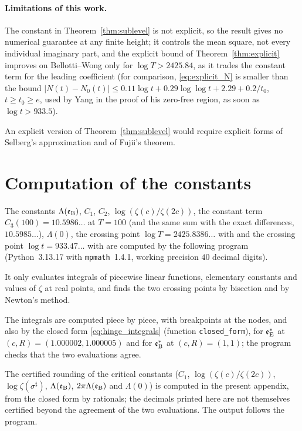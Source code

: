 \documentclass[11pt,a4paper]{article}
\makeatletter
\numberwithin{equation}{section}
\DeclareRobustCommand{\CGref}[1]{\ref{#1}}
\DeclareRobustCommand{\CGeqref}[1]{\eqref{#1}}
\DeclareRobustCommand{\CGcite}[2][]{\if\relax\detokenize{#1}\relax\cite{#2}\else\cite[#1]{#2}\fi}
\let\CG@origref\ref
\let\CG@origeqref\eqref
\newcommand{\CG@gettip}[1]{\@ifundefined{CGTip@#1}{#1}{\csname CGTip@#1\endcsname}}
\newcommand{\CG@getbib}[1]{\@ifundefined{CGBib@#1}{#1}{\csname CGBib@#1\endcsname}}
\DeclareRobustCommand{\CGref}[1]{\pdftooltip{\CG@origref{#1}}{\CG@gettip{#1}}}
\DeclareRobustCommand{\CGeqref}[1]{\pdftooltip{\CG@origeqref{#1}}{\CG@gettip{#1}}}
\DeclareRobustCommand{\CGcite}[2][]{\pdftooltip{\if\relax\detokenize{#1}\relax\cite{#2}\else\cite[#1]{#2}\fi}{\CG@getbib{#2}}}
\theoremstyle{definition}
\theoremstyle{remark}
\newcommand{\Nz}{N_0} %
\newcommand{\eB}{\mathfrak e_{\rm B}}
\newcommand{\eE}{\mathfrak e_{\rm E}}
\makeatother
\begin{document}
\paragraph{Limitations of this work.}
The constant in Theorem~\CGref{thm:sublevel} is not explicit, so the result gives no numerical guarantee at any finite height; it controls the mean square, not every individual imaginary part, and the explicit bound of Theorem~\CGref{thm:explicit} improves on Bellotti--Wong only for $\log T>2425.84$, as it trades the constant term for the leading coefficient (for comparison, \CGeqref{eq:explicit_N} is smaller than the bound $|N(t)-\Nz(t)|\le0.11\log t+0.29\log\log t+2.29+0.2/t_0$, $t\ge t_0\ge e$, used by Yang \CGcite[(4.29)]{Yang2024} in the proof of his zero-free region, as soon as $\log t>933.5$).

An explicit version of Theorem~\CGref{thm:sublevel} would require explicit forms of Selberg's approximation and of Fujii's theorem.

\appendix
\section{Computation of the constants}\label{app:code}
The constants $\Lambda(\eB)$, $C_1$, $C_2$, $\log(\zeta(c)/\zeta(2c))$, the constant term $C_3(100)=10.5986\ldots$ at $T=100$ (and the same sum with the exact differences, $10.5985\ldots$), $\Lambda(0)$, the crossing point $\log T=2425.8386\ldots$ with \CGcite{BellottiWong2025} and the crossing point $\log t=933.47\ldots$ with \CGcite[(4.29)]{Yang2024} are computed by the following program (Python~3.13.17 with \texttt{mpmath}~1.4.1, working precision $40$ decimal digits).

It only evaluates integrals of piecewise linear functions, elementary constants and values of $\zeta$ at real points, and finds the two crossing points by bisection and by Newton's method.

The integrals are computed piece by piece, with breakpoints at the nodes, and also by the closed form \CGeqref{eq:hinge_integrals} (function \texttt{closed\_form}), for $\eE^*$ at $(c,R)=(1.000002,1.000005)$ and for $\eB^*$ at $(c,R)=(1,1)$; the program checks that the two evaluations agree.

The certified rounding of the critical constants ($C_1$, $\log(\zeta(c)/\zeta(2c))$, $\log\zeta(\sigma^\sharp)$, $\Lambda(\eB)$, $2\pi\Lambda(\eB)$ and $\Lambda(0)$) is computed in the present appendix, from the closed form by rationals; the decimals printed here are not themselves certified beyond the agreement of the two evaluations. The output follows the program.
\end{document}
